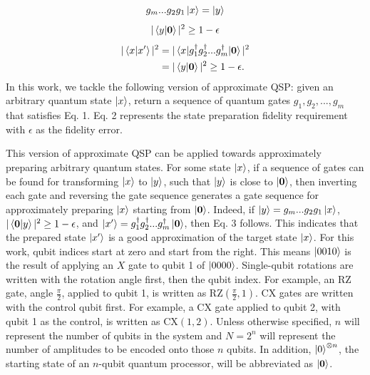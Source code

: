 \begin{equation}
\label{eq1}
g_m ... g_2g_1\mathinner{|{x}\rangle} = \mathinner{|{y}\rangle}
\end{equation}
\begin{equation}
\label{eq2}
|\mathinner{\langle{y|\mathbf{0}}\rangle}|^2 \geq 1 - \epsilon
\end{equation}
\begin{align}
\label{eq3}
|\mathinner{\langle{x|x'}\rangle}|^2 &= |\mathinner{\langle{x|g_1^\dagger g_2^\dagger ... g_m^\dagger|\mathbf{0}}\rangle}|^2 
\nonumber\\
&= |\mathinner{\langle{y|\mathbf{0}}\rangle}|^2 \geq 1 - \epsilon.
\end{align}
In this work, we tackle the following version of approximate QSP: given an
arbitrary quantum state $\mathinner{|{x}\rangle}$, return a sequence of quantum gates 
$g_1, g_2, ..., g_m$ that satisfies Eq. 1.  Eq. 2 represents the state preparation fidelity requirement with $\epsilon$ as the fidelity error.

This version of approximate QSP can be applied towards approximately preparing
arbitrary quantum states. For some state $\mathinner{|{x}\rangle}$, if a sequence of gates can
be found for transforming $\mathinner{|{x}\rangle}$ to $\mathinner{|{y}\rangle}$, such that $\mathinner{|{y}\rangle}$ is close
to $\mathinner{|{\mathbf{0}}\rangle}$, then inverting each gate and reversing the gate sequence generates
a gate sequence for approximately preparing $\mathinner{|{x}\rangle}$ starting from $\mathinner{|{\mathbf{0}}\rangle}$.
Indeed, if $\mathinner{|{y}\rangle} = g_m ... g_2g_1\mathinner{|{x}\rangle}$, 
$|\mathinner{\langle{\mathbf{0}|y}\rangle}|^2 \geq 1 - \epsilon$, and 
$\mathinner{|{x'}\rangle} = g_1^\dagger g_2^\dagger ... g_m^\dagger\mathinner{|{\mathbf{0}}\rangle}$, then Eq. 3 follows. This indicates that the prepared state $\mathinner{|{x'}\rangle}$ is a good approximation of the
target state $\mathinner{|{x}\rangle}$. For this work, qubit indices start at zero and start from the right. This means
$\mathinner{|{0010}\rangle}$ is the result of applying an $X$ gate to qubit 1 of $\mathinner{|{0000}\rangle}$.
Single-qubit rotations are written with the rotation angle first, then the qubit
index. For example, an RZ gate, angle $\frac{\pi}{2}$, applied to qubit 1, is
written as RZ$(\frac{\pi}{2}, 1)$. CX gates are written with the control qubit 
first. For example, a CX gate applied to qubit 2, with qubit 1 as the control,
is written as CX$(1, 2)$. Unless otherwise specified, $n$ will represent the
number of qubits in the system and $N = 2^n$ will represent the number of
amplitudes to be encoded onto those $n$ qubits. In addition, 
$\mathinner{|{0}\rangle}^{\otimes n}$, the starting state of an $n$-qubit quantum processor, 
will be abbreviated as $\mathinner{|{\mathbf{0}}\rangle}$.

